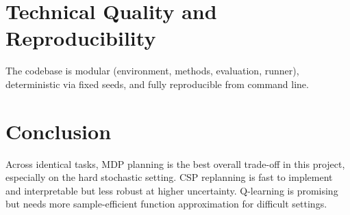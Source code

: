 \documentclass[letterpaper]{article} %
\begin{document}
\section{Technical Quality and Reproducibility}
The codebase is modular (environment, methods, evaluation, runner), deterministic via fixed seeds, and fully reproducible from command line.

\section{Conclusion}
Across identical tasks, MDP planning is the best overall trade-off in this project, especially on the hard stochastic setting. CSP replanning is fast to implement and interpretable but less robust at higher uncertainty. Q-learning is promising but needs more sample-efficient function approximation for difficult settings.


\end{document}
